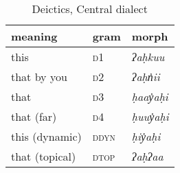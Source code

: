 \begin{table}[ht]
\centering
\caption{Deictics, Central dialect}
\label{table:deictics}
\begin{tabular}{lll}
meaning                            & gram               & morph                                         \\ \hline
\multicolumn{1}{|l|}{this} & \multicolumn{1}{l|}{\textsc{d1}}   & \multicolumn{1}{l|}{\textit{ʔaḥkuu}}                   \\ \hline
\multicolumn{1}{|l|}{that by you} & \multicolumn{1}{l|}{\textsc{d2}}   & \multicolumn{1}{l|}{\textit{ʔaḥn̓ii}}                   \\ \hline
\multicolumn{1}{|l|}{that} & \multicolumn{1}{l|}{\textsc{d3}}   & \multicolumn{1}{l|}{\textit{ḥaay̓aḥi}}                   \\ \hline
\multicolumn{1}{|l|}{that (far)} & \multicolumn{1}{l|}{\textsc{d4}}   & \multicolumn{1}{l|}{\textit{ḥuuy̓aḥi}}                   \\ \hline
\multicolumn{1}{|l|}{this (dynamic)} & \multicolumn{1}{l|}{\textsc{ddyn}}   & \multicolumn{1}{l|}{\textit{ḥiy̓aḥi}}                   \\ \hline
\multicolumn{1}{|l|}{that (topical)} & \multicolumn{1}{l|}{\textsc{dtop}}   & \multicolumn{1}{l|}{\textit{ʔaḥʔaa}}                   \\ \hline
\end{tabular}
\end{table}